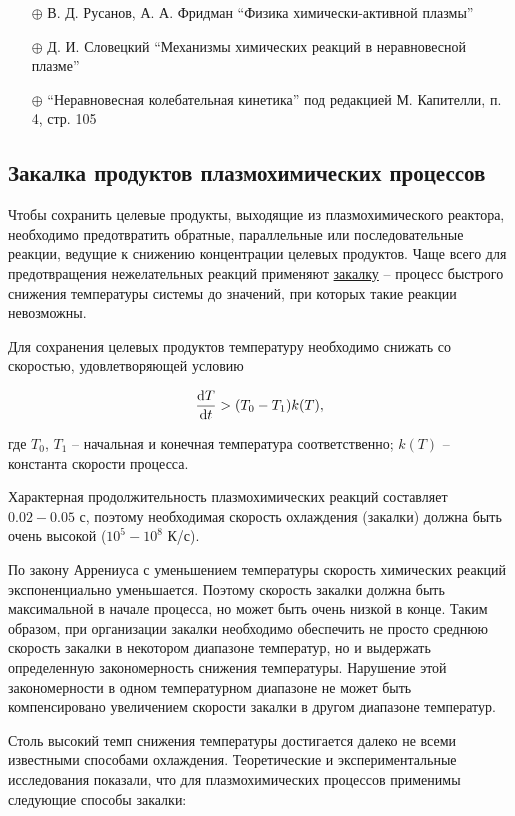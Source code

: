 \documentclass[10pt, a4paper]{article}
\begin{document}
\begin{itemize}
	\item[$\oplus$] В. Д. Русанов, А. А. Фридман ``Физика химически-активной плазмы''
	\item[$\oplus$] Д. И. Словецкий ``Механизмы химических реакций в неравновесной плазме''
	\item[$\oplus$] ``Неравновесная колебательная кинетика'' под редакцией М. Капителли, п. 4, стр. 105
\end{itemize}

\subsection{Закалка продуктов плазмохимических процессов}

Чтобы сохранить целевые продукты, выходящие из плазмохимического реактора, необходимо предотвратить обратные, параллельные или последовательные реакции, ведущие к снижению концентрации целевых продуктов. Чаще всего для предотвращения нежелательных реакций применяют \uline{закалку} -- процесс быстрого снижения температуры системы до значений, при которых такие реакции невозможны.

Для сохранения целевых продуктов температуру необходимо снижать со скоростью, удовлетворяющей условию

\begin{equation*}
	\dv{T}{t}>(T_0-T_1)k(T),
\end{equation*}

где $T_0$, $T_1$ -- начальная и конечная температура соответственно; $k(T)$ -- константа скорости процесса.

Характерная продолжительность плазмохимических реакций составляет $0.02-0.05$ с, поэтому необходимая скорость охлаждения (закалки) должна быть очень высокой ($10^5-10^8$ К/с).

По закону Аррениуса с уменьшением температуры скорость химических реакций экспоненциально уменьшается. Поэтому скорость закалки должна быть максимальной в начале процесса, но может быть очень низкой в конце. Таким образом, при организации закалки необходимо обеспечить не просто среднюю скорость закалки в некотором диапазоне температур, но и выдержать определенную закономерность снижения температуры. Нарушение этой закономерности в одном температурном диапазоне не может быть компенсировано увеличением скорости закалки в другом диапазоне температур.

Столь высокий темп снижения температуры достигается далеко не всеми известными способами охлаждения. Теоретические и экспериментальные исследования показали, что для плазмохимических процессов применимы следующие способы закалки:
\end{document}

